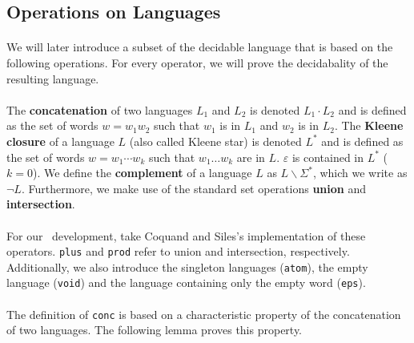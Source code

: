     \subsection{Operations on Languages}

    \paragraph{}
    We will later introduce a subset of the decidable language that is based on the following operations. For every operator, we will prove the decidabality of the resulting language.

    \paragraph{}

    The \textbf{concatenation} of two languages $L_1$ and $L_2$ is denoted $L_1 \cdot L_2$ and is defined as the set of words $w = w_1 w_2$ such that $w_1$ is in $L_1$ and $w_2$ is in $L_2$.
    The \textbf{Kleene closure} of a language $L$ (also called Kleene star) is denoted $L^*$ and is defined as the set of words $w = w_1 \cdots w_k$ such that $w_1 \ldots w_k$ are in $L$. $\varepsilon$ is contained in $L^*$ ($k=0$).
    We define the \textbf{complement} of a language $L$ as $L \backslash \Sigma^*$, which we write as $\neg L$.
    Furthermore, we make use of the standard set operations \textbf{union} and \textbf{intersection}.

    \paragraph{}
    For our \coq\ development,
    take Coquand and Siles's \cite{DBLP:conf/cpp/CoquandS11} implementation of these operators. 
    \lstinline{plus} and \lstinline{prod} refer to union and intersection, respectively. 
    Additionally, we also introduce the singleton languages (\lstinline{atom}), the empty language (\lstinline{void}) and the language containing only the empty word (\lstinline{eps}).


    \paragraph{}
    The definition of \lstinline{conc} is based on a characteristic property of the concatenation of two languages. The following lemma proves this property.

